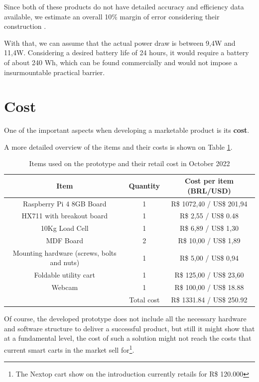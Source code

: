 \documentclass[openright]{normas-utf-tex} %
\begin{document}
Since both of these products do not have detailed accuracy and efficiency data
available, we estimate an overall 10\% margin of error considering their
construction \cite{Chen2017}. 

With that, we can assume that the actual power draw is between 9,4W and 11,4W.
Considering a desired  battery life of 24 hours, it would require a battery of
about 240 Wh, which can be found commercially and would not impose a
insurmountable practical barrier.

\section{Cost}

One of the important aspects when developing a marketable product is its \textbf{cost}.

A more detailed overview of the items and their costs is shown on Table \ref{tbl:cost}.

\begin{table}[H]
	\centering
	\label{tab:correlacao}
	\begin{tabular}{c c c}
		\hline 
        Item & Quantity & Cost per item (BRL/USD) \\
		\hline
        Raspberry Pi 4 8GB Board &  1 & R\$ 1072,40 / US\$ 201,94 \\
        HX711 with breakout board &  1  & R\$ 2,55 / US\$ 0.48 \\
        10Kg Load Cell & 1 & R\$ 6,89 / US\$ 1,30 \\
        MDF Board &  2  & R\$ 10,00 / US\$ 1,89 \\
        Mounting hardware (screws, bolts and nuts) &  1  & R\$ 5,00 / US\$ 0,94 \\
        Foldable utility cart &  1  & R\$ 125,00 / US\$ 23,60 \\
        Webcam &  1  & R\$ 100,00 / US\$ 18.88 \\
		\hline 
        & Total cost & R\$ 1331.84 / US\$ 250.92 \\
        \hline
	\end{tabular}
    \caption[Items used on the prototype and their approximate retail cost in Brazil as of October 2022]{Items used on the prototype and their retail cost in October 2022}
    \label{tbl:cost}
\end{table}

Of course, the developed prototype does not include all the necessary hardware
and software structure to deliver a successful product, but still it might show that at a
fundamental level, the cost of such a solution might not reach the costs that
current smart carts in the market sell for\footnote{The Nextop cart show on the
introduction currently retails for R\$ 120.000}.
\end{document}
